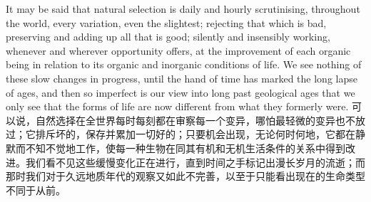 \darwinpair
{It may be said that natural selection is daily and hourly scrutinising, throughout the world, every variation, even the slightest; rejecting that which is bad, preserving and adding up all that is good; silently and insensibly working, whenever and wherever opportunity offers, at the improvement of each organic being in relation to its organic and inorganic conditions of life. We see nothing of these slow changes in progress, until the hand of time has marked the long lapse of ages, and then so imperfect is our view into long past geological ages that we only see that the forms of life are now different from what they formerly were.}
{可以说，自然选择在全世界每时每刻都在审察每一个变异，哪怕最轻微的变异也不放过；它排斥坏的，保存并累加一切好的；只要机会出现，无论何时何地，它都在静默而不知不觉地工作，使每一种生物在同其有机和无机生活条件的关系中得到改进。我们看不见这些缓慢变化正在进行，直到时间之手标记出漫长岁月的流逝；而那时我们对于久远地质年代的观察又如此不完善，以至于只能看出现在的生命类型不同于从前。}

